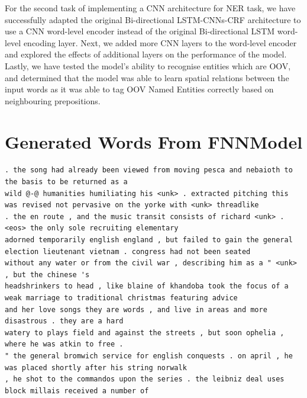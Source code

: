 \documentclass[sigconf,nonacm=true]{acmart}
\begin{document}
For the second task of implementing a CNN architecture for NER task, we have successfully adapted the original Bi-directional LSTM-CNNs-CRF architecture to use a CNN word-level encoder instead of the original Bi-directional LSTM
word-level encoding layer. Next, we added more CNN layers to the word-level encoder and explored the effects of additional layers on the performance of the model. Lastly, we have tested the model's ability to recognise entities which are OOV, and determined that the model was able to learn spatial relations between the input words as it was able to tag OOV Named Entities correctly based on neighbouring prepositions.



\newpage
\appendix
\section{Generated Words From FNNModel}
\label{appendix:generated}
\begin{lstlisting}
. the song had already been viewed from moving pesca and nebaioth to the basis to be returned as a
wild @-@ humanities humiliating his <unk> . extracted pitching this was revised not pervasive on the yorke with <unk> threadlike
. the en route , and the music transit consists of richard <unk> . <eos> the only sole recruiting elementary
adorned temporarily english england , but failed to gain the general election lieutenant vietnam . congress had not been seated
without any water or from the civil war , describing him as a " <unk> , but the chinese 's
headshrinkers to head , like blaine of khandoba took the focus of a weak marriage to traditional christmas featuring advice
and her love songs they are words , and live in areas and more disastrous . they are a hard
watery to plays field and against the streets , but soon ophelia , where he was atkin to free .
" the general bromwich service for english conquests . on april , he was placed shortly after his string norwalk
, he shot to the commandos upon the series . the leibniz deal uses block millais received a number of

\end{lstlisting}
\end{document}
